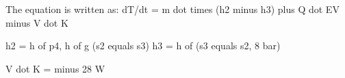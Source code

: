 The equation is written as:  
dT/dt = m dot times (h2 minus h3) plus Q dot EV minus V dot K  

h2 = h of p4, h of g (s2 equals s3)  
h3 = h of (s3 equals s2, 8 bar)  

V dot K = minus 28 W